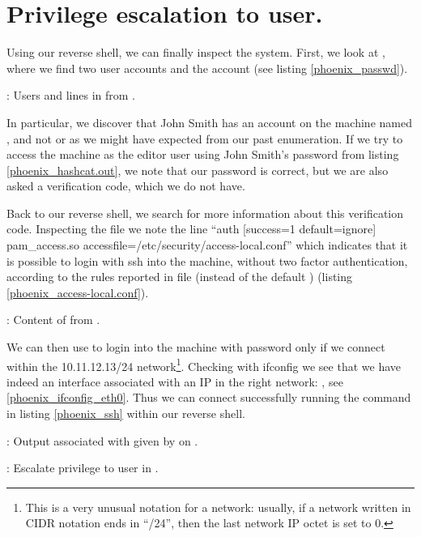 \section{Privilege escalation to user.}
\par Using our reverse shell, we can finally inspect the system. First, we look at , where we find two user accounts and the  account (see listing \ref{phoenix_passwd}).
\begin{listing}
  
  \caption{: Users and  lines in  from .}
  \label{phoenix_passwd}
\end{listing}
\par In particular, we discover that John Smith has an account on the machine named , and not  or  as we might have expected from our past enumeration. If we try to access the machine as the editor user using John Smith's password from listing \ref{phoenix_hashcat.out}, we note that our password is correct, but we are also asked a verification code, which we do not have.
\par Back to our reverse shell, we search for more information about this verification code. Inspecting the file  we note the line ``auth [success=1 default=ignore] pam\_access.so accessfile=/etc/security/access-local.conf'' which indicates that it is possible to login with ssh into the machine, without two factor authentication, according to the rules reported in file  (instead of the default ) (listing \ref{phoenix_access-local.conf}).
\begin{listing}
  
  \caption{: Content of  from .}
  \label{phoenix_access-local.conf}
\end{listing}
\par We can then use  to login into the machine with password only if we connect within the 10.11.12.13/24 network\footnote{This is a very unusual notation for a network: usually, if a network written in CIDR notation ends in ``/24'', then the last network IP octet is set to 0.}. Checking with ifconfig we see that we have indeed an interface associated with an IP in the right network: , see \ref{phoenix_ifconfig_eth0}. Thus we can connect successfully running the command in listing \ref{phoenix_ssh} within our reverse shell.
\begin{listing}
  
  \caption{: Output associated with  given by  on .}
  \label{phoenix_ifconfig_eth0}
\end{listing}
\begin{listing}
  \caption{: Escalate privilege to user in .}
  \label{phoenix_ssh}
\end{listing}
